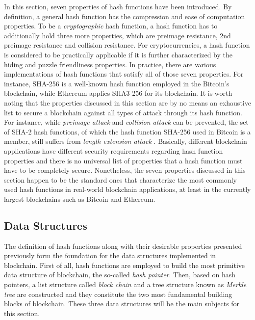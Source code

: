 In this section, seven properties of hash functions have been introduced. By definition, a general hash function has the compression and ease of computation properties. To be a \textit{cryptographic} hash function, a hash function has to additionally hold three more properties, which are preimage resistance, 2nd preimage resistance and collision resistance. For cryptocurrencies, a hash function is considered to be practically applicable if it is further characterized by the hiding and puzzle friendliness properties. In practice, there are various implementations of hash functions that satisfy all of those seven properties. For instance, SHA-256 is a well-known hash function employed in the Bitcoin's blockchain, while Ethereum applies SHA3-256 for its blockchain. It is worth noting that the properties discussed in this section are by no means an exhaustive list to secure a blockchain against all types of attack through its hash function. For instance, while \textit{preimage attack} and \textit{collision attack} can be prevented, the set of SHA-2 hash functions, of which the hash function SHA-256 used in Bitcoin is a member, still suffers from \textit{length extension attack} \cite{duong2009flickr}. Basically, different blockchain applications have different security requirements regarding hash function properties and there is no universal list of properties that a hash function must have to be completely secure. Nonetheless, the seven properties discussed in this section happen to be the standard ones that characterize the most commonly used hash functions in real-world blockchain applications, at least in the currently largest blockchains such as Bitcoin and Ethereum.  





\subsection{Data Structures} \label{subsec:datastructure}

The definition of hash functions along with their desirable properties presented previously form the foundation for the data structures implemented in blockchain. First of all, hash functions are employed to build the most primitive data structure of blockchain, the so-called \textit{hash pointer}. Then, based on hash pointers, a list structure called \textit{block chain} and a tree structure known as \textit{Merkle tree} are constructed and they constitute the two most fundamental building blocks of blockchain. These three data structures will be the main subjects for this section. 

